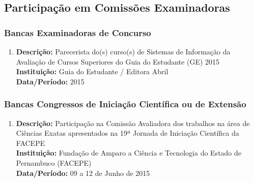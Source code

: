 \documentclass[a4paper,oneside,10pt]{article}
\begin{document}
\subsection{Participa\c{c}\~{a}o em Comiss\~{o}es Examinadoras}
\vspace{0.3cm}

\subsubsection{Bancas Examinadoras de Concurso}
\vspace{0.3cm}

\begin{enumerate}
\renewcommand{\labelenumi}{{\large\bfseries\arabic{enumi}.}}
\vspace{0.3cm}

\item       \textbf{Descrição:} Parecerista do(s) curso(s) de Sistemas de Informação da Avaliação de Cursos Superiores do Guia do Estudante (GE) 2015 \mbox{}\\
            \textbf{Instituição:} Guia do Estudante / Editora Abril \\
            \textbf{Data/Período:} 2015 %

\end{enumerate}


\subsubsection{Bancas Congressos de Inicia\c{c}\~{a}o Cient\'{i}fica ou de Extens\~{a}o}
\vspace{0.3cm}

\begin{enumerate}
\renewcommand{\labelenumi}{{\large\bfseries\arabic{enumi}.}}
\vspace{0.3cm}

\item       \textbf{Descrição:} Participação na Comissão Avaliadora dos trabalhos na área de Ciências Exatas apresentados na 19ª Jornada de Iniciação Científica da FACEPE \mbox{} \\
            \textbf{Instituição:} Fundação de Amparo a Ciência e Tecnologia do Estado de Pernambuco (FACEPE) \\
            \textbf{Data/Período:} 09 a 12 de Junho de 2015

\end{enumerate}
\end{document}

